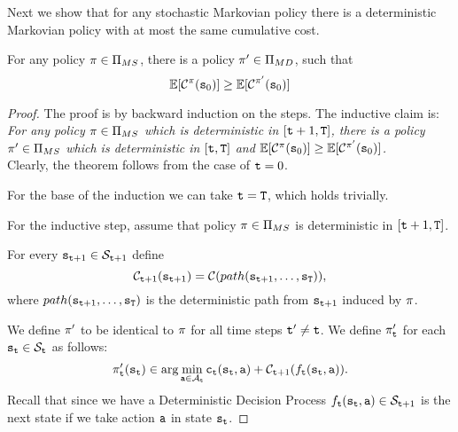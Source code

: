 Next we show that for any stochastic Markovian policy there is a
deterministic Markovian policy with at most the same cumulative
cost.

\begin{theorem}
\label{chp2:stochastic-deterministic}
For any policy $\pi\in \Pi_{MS}$, there is a policy
$\pi'\in\Pi_{MD}$, such that
\[
\mathbb{E}[\mathcal{C}^\pi({\tt s}_0)]\geq \mathbb{E}[\mathcal{C}^{\pi'}({\tt s}_0)]
\]
\end{theorem}

\begin{proof}
The proof is by backward induction on the steps. The inductive claim is:\\
{\em For any policy $\pi\in \Pi_{MS}$ which is deterministic in
$[{\tt t}+1,{\tt T}]$, there is a policy $\pi'\in \Pi_{MS}$
which is deterministic in $[{\tt t},{\tt T}]$ and
$\mathbb{E}[\mathcal{C}^\pi({\tt s}_0)]\geq
\mathbb{E}[\mathcal{C}^{\pi'}({\tt s}_0)]$.}\\
Clearly, the theorem follows from the case of ${\tt t}=0$.

For the base of the induction we can take ${\tt t}={\tt T}$, which
holds trivially.

For the inductive step, assume that policy $\pi\in \Pi_{MS}$ is
deterministic in $[{\tt t}+1,{\tt T}]$.


For every ${\tt s}_{{\tt t}+1}\in \mathcal{S}_{{\tt t}+1}$ define
\[
\mathcal{C}_{{\tt t}+1}({\tt s}_{{\tt t}+1})=\mathcal{C}(path({\tt s}_{{\tt t}+1},
\dots , {\tt s}_{\tt T})),
\]
where $path({\tt s}_{{\tt t}+1}, \dots , {\tt s}_{\tt T})$ is the
deterministic path from ${\tt s}_{{\tt t}+1}$ induced by $\pi$.

We define $\pi'$ to be identical to $\pi$ for all time steps
${\tt t}'\neq {\tt t}$. We define $\pi'_{\tt t}$ for each
${\tt s}_{\tt t}\in \mathcal{S}_{\tt t}$ as follows:
\begin{equation}
\label{eq:sec2-MS-MD}
\pi'_{\tt t}({\tt s}_{\tt t})\in\arg\min_{{\tt a}\in
\mathcal{A}_{\tt t}} {\tt c}_{{\tt t}}({\tt s}_{\tt t},{\tt a})+
\mathcal{C}_{{\tt t}+1}(f_{\tt t}({\tt s}_{\tt t},{\tt a})).
\end{equation}
Recall that since we have a Deterministic Decision Process
$f_{\tt t}({\tt s}_{\tt t},{\tt a})\in \mathcal{S}_{{\tt t}+1}$ is
the next state if we take action ${\tt a}$ in state ${\tt s}_{\tt t}$.


\end{proof}
